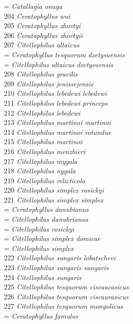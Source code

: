 \documentclass[
]{article}
\begin{document}
= \emph{Catallagia onaga}\\
204 \emph{Ceratophyllus wui}\\
205 \emph{Ceratophyllus zhovtyi}\\
206 \emph{Ceratophyllus zhovtyii}\\
207 \emph{Citellophilus altaicus}\\
= \emph{Ceratophyllus tesquorum dzetysuensis}\\
= \emph{Citellophilus altaicus dzetysuensis}\\
208 \emph{Citellophilus gracilis}\\
209 \emph{Citellophilus jenissejensis}\\
210 \emph{Citellophilus lebedewi lebedewi}\\
211 \emph{Citellophilus lebedewi princeps}\\
212 \emph{Citellophilus lebedewi}\\
213 \emph{Citellophilus martinoi martinoi}\\
214 \emph{Citellophilus martinoi rotundus}\\
215 \emph{Citellophilus martinoi}\\
216 \emph{Citellophilus menzbieri}\\
217 \emph{Citellophilus mygala}\\
218 \emph{Citellophilus nygala}\\
219 \emph{Citellophilus relicticola}\\
220 \emph{Citellophilus simplex rosickyi}\\
221 \emph{Citellophilus simplex simplex}\\
= \emph{Ceratophyllus danubianus}\\
= \emph{Citellophilus danubrianus}\\
= \emph{Citellophilus rosickyi}\\
= \emph{Citellophilus simplex domicae}\\
= \emph{Citellophilus simplex}\\
222 \emph{Citellophilus sungaris lobatschevi}\\
223 \emph{Citellophilus sungaris sungaris}\\
224 \emph{Citellophilus sungaris}\\
225 \emph{Citellophilus tesquorum ciscaucasicus}\\
226 \emph{Citellophilus tesquorum ciscaurasicus}\\
227 \emph{Citellophilus tesquorum mongolicus}\\
= \emph{Ceratophyllus famulus}\\
\end{document}
